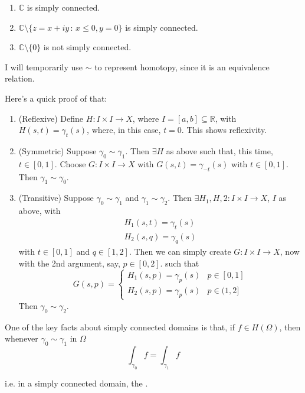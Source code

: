 \documentclass[notoc,notitlepage]{tufte-book}
\begin{document}
\begin{ex}
  \begin{enumerate}
    \item $\mathbb{C}$ is simply connected.
    \item $\mathbb{C} \setminus \{z = x + iy \, : \, x \leq 0, y = 0\}$ is simply connected.
    \item $\mathbb{C} \setminus \{0\}$ is not simply connected.
  \end{enumerate}
\end{ex}

\begin{note}
  I will temporarily use $\sim$ to represent homotopy, since it is an equivalence relation.

  Here's a quick proof of that:
  \begin{enumerate}
    \item (Reflexive) Define $H : I \times I \to X$, where $I = [a, b] \subseteq \mathbb{R}$, with $H(s, t) = \gamma_t(s)$, where, in this case, $t = 0$. This shows reflexivity.

    \item (Symmetric) Suppose $\gamma_0 \sim \gamma_1$. Then $\exists H$ as above such that, this time, $t \in [0, 1]$. Choose $G : I \times I \to X$ with $G(s, t) = \gamma_{-t}(s)$ with $t \in [0, 1]$. Then $\gamma_1 \sim \gamma_0$.

    \item (Transitive) Suppose $\gamma_0 \sim \gamma_1$ and $\gamma_1 \sim \gamma_2$. Then $\exists H_1, H,2 : I \times I \to X$, $I$ as above, with
    \begin{gather*}
      H_1(s, t) = \gamma_t(s) \\
      H_2(s, q) = \gamma_q(s)
    \end{gather*}
    with $t \in [0, 1]$ and $q \in [1, 2]$. Then we can simply create $G : I \times I \to X$, now with the 2nd argument, say, $p \in [0, 2]$. such that
    \begin{equation*}
      G(s, p) = \begin{cases}
        H_1(s, p) = \gamma_p (s) & p \in [0, 1] \\
        H_2(s, p) = \gamma_p (s) & p \in (1, 2]
      \end{cases}
    \end{equation*}
    Then $\gamma_0 \sim \gamma_2$.
  \end{enumerate}

  One of the key facts about simply connected domains is that, if $f \in H(\Omega)$, then whenever $\gamma_0 \sim \gamma_1$ in $\Omega$
  \begin{equation*}
    \int_{\gamma_0} f = \int_{\gamma_1} f
  \end{equation*}

  i.e. in a simply connected domain, the .
\end{note}
\end{document}
